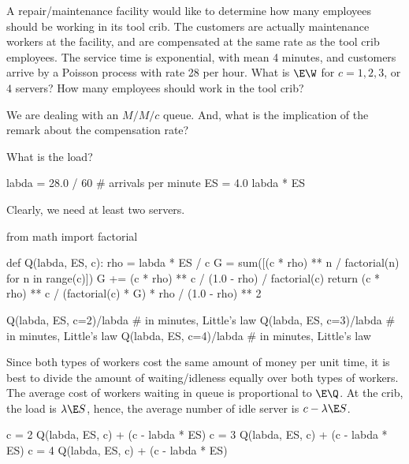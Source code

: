 \begin{exercise}[Hall 5.10]\label{ex:l-217}
A repair/maintenance facility would like to determine how many employees should be working in its tool crib.
 The customers are actually maintenance workers at the facility, and are compensated at the same rate as the tool crib employees.
 The service time is exponential, with mean 4 minutes, and customers arrive by a Poisson process with rate 28 per hour.
 What is $\E \W$ for $c=1, 2, 3$, or $4$ servers?
 How many employees should work in the tool crib?
\begin{hint}
We are dealing with an $M/M/c$ queue. And, what is the implication of the remark about the compensation rate?
\end{hint}
\begin{solution}
What is the load?
\begin{pyconsole}
labda = 28.0 / 60  # arrivals per minute
ES = 4.0
labda * ES
\end{pyconsole}
Clearly, we need at least two servers.

\begin{pyconsole}
from math import factorial


def Q(labda, ES, c):
    rho = labda * ES / c
    G = sum([(c * rho) ** n / factorial(n) for n in range(c)])
    G += (c * rho) ** c / (1.0 - rho) / factorial(c)
    return (c * rho) ** c / (factorial(c) * G) * rho / (1.0 - rho) ** 2

Q(labda, ES, c=2)/labda  # in minutes, Little's law
Q(labda, ES, c=3)/labda  # in minutes, Little's law
Q(labda, ES, c=4)/labda  # in minutes, Little's law
\end{pyconsole}


Since both types of workers cost the same amount of money per unit time, it is best to divide the amount of waiting/idleness equally over both types of workers.
The average cost of workers waiting in queue is proportional to $\E \Q$.  At the crib, the load is $\lambda \E S$, hence, the average number of idle server is $c-\lambda \E S$.

\begin{pyconsole}
c = 2
Q(labda, ES, c) + (c - labda * ES)
c = 3
Q(labda, ES, c) + (c - labda * ES)
c = 4
Q(labda, ES, c) + (c - labda * ES)

\end{pyconsole}
\end{solution}
\end{exercise}

